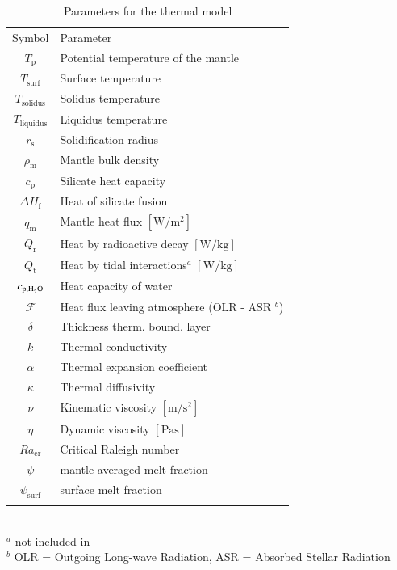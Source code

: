 \documentclass[oneside,twocolumn]{article}
\begin{document}
\begin{table}[ht]
    \caption[Parameters thermal model]{Parameters for the thermal model}
    \begin{tabular}{cl}
    	\noalign{\smallskip}
    	\hline
    	\noalign{\smallskip}
    	Symbol & Parameter \\ 
    	\noalign{\smallskip}
    	\hline \hline
    	\noalign{\smallskip}
    	$T_\mathrm{p}$ & Potential temperature of the mantle \\
    	$T_\mathrm{surf}$ & Surface temperature \\
    	$T_\mathrm{solidus}$ & Solidus temperature \\
    	$T_\mathrm{liquidus}$ & Liquidus temperature \\
    	$r_\mathrm{s}$ & Solidification radius \\
    	$\rho_\mathrm{m}$ & Mantle bulk density \\ 
    	$c_\mathrm{p} $ & Silicate heat capacity \\
    	$\Delta H_\mathrm{f}$ & Heat of silicate fusion \\
    	$q_\mathrm{m}$ & Mantle heat flux $[\si{\watt\per\square\metre}]$\\
    	$Q_\mathrm{r}$ & Heat by radioactive decay $[\si{\watt\per\kilogram}]$\\
    	$Q_\mathrm{t}$ & Heat by tidal interactions${}^{a}$ $[\si{\watt\per\kilogram}]$\\
    	$c_{\mathrm{p},\ce{H2O}} $ & Heat capacity of water \\
    	$\mathcal{F}$ & Heat flux leaving atmosphere (OLR - ASR ${}^{b}$)\\
    	$\delta$ &Thickness therm. bound. layer \\
    	$k$ & Thermal conductivity \\
    	$\alpha$ & Thermal expansion coefficient \\
    	$\kappa$ & Thermal diffusivity \\
    	$\nu$ & Kinematic viscosity $[\si{\metre\per\second\squared}]$\\
    	$\eta$ & Dynamic viscosity $[\si{\pascal\second}]$\\
    	$Ra_\mathrm{cr}$ & Critical Raleigh number \\
    	$\psi$ & mantle averaged melt fraction \\
    	$\psi_\mathrm{surf}$ & surface melt fraction \\
    	\noalign{\smallskip}
    	\hline
    \end{tabular}
    \\
    ${}^{a}$ not included in \citet{Schaefer2016}\\
    ${}^{b}$ OLR = Outgoing Long-wave Radiation, ASR = Absorbed Stellar Radiation
    \label{Tab_Therm_Model}
\end{table}
\end{document}
